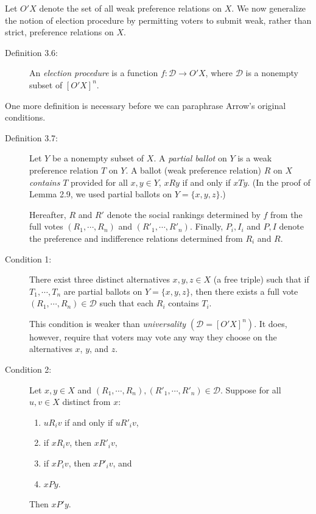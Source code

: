 \documentclass{article}
\begin{document}
Let $O'X$ denote the set of all weak preference relations on $X$. We now generalize the notion of election procedure by permitting voters to submit weak, rather than strict, preference relations on $X$.

\begin{description}

\item[Definition 3.6:] An \emph{election procedure} is a function $f: \mathcal{D} \rightarrow O'X$, where $\mathcal{D}$ is a nonempty subset of $[O'X]^{n}$.

\end{description}

One more definition is necessary before we can paraphrase Arrow's original conditions.

\begin{description}

\item[Definition 3.7:] Let $Y$ be a nonempty subset of $X$. A \emph{partial ballot} on $Y$ is a weak preference relation $T$ on $Y$. A ballot (weak preference relation) $R$ on $X$ \emph{contains} $T$ provided for all $x,y \in Y$, $xRy$ if and only if $xTy$. (In the proof of Lemma 2.9, we used partial ballots on $Y = \{ x,y,z \}$.)

  Hereafter, $R$ and $R'$ denote the social rankings determined by $f$ from the full votes $(R_{1},\cdots,R_{n})$ and $(R'_{1},\cdots,R'_{n})$. Finally, $P_{i},I_{i}$ and $P,I$ denote the preference and indifference relations determined from $R_{i}$ and $R$.

\item[Condition 1:] There exist three distinct alternatives $x,y,z \in X$ (a free triple) such that if $T_{1}, \cdots, T_{n}$ are partial ballots on $Y = \{ x,y,z \}$, then there exists a full vote $(R_{1},\cdots,R_{n}) \in \mathcal{D}$ such that each $R_{i}$ contains $T_{i}$.

  This condition is weaker than \emph{universality} $(\mathcal{D} = [O'X]^{n})$. It does, however, require that voters may vote any way they choose on the alternatives $x$, $y$, and $z$.

\item[Condition 2:] Let $x,y \in X$ and $(R_{1},\cdots,R_{n}), (R'_{1},\cdots,R'_{n}) \in \mathcal{D}$. Suppose for all $u,v \in X$ distinct from $x$:
  \begin{enumerate}[\hspace{1cm}(a)]
    \item $uR_{i}v$ if and only if $uR'_{i}v$,
    \item if $xR_{i}v$, then $xR'_{i}v$, 
    \item if $xP_{i}v$, then $xP'_{i}v$, and
    \item $xPy$.
  \end{enumerate}
  Then $xP'y$.


\end{description}
\end{document}
